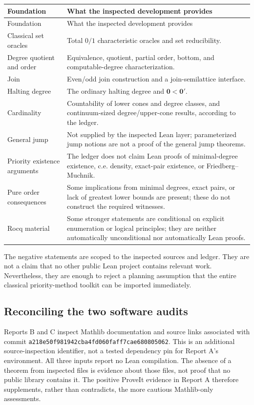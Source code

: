 \documentclass[11pt,a4paper]{article}
\newcommand{\zero}{\mathbf0}
\newcommand{\onejump}{\mathbf0'}
\theoremstyle{definition}\newtheorem{definition}[theorem]{Definition}
\theoremstyle{remark}\newtheorem{remark}[theorem]{Remark}
\begin{document}
\begin{longtable}{@{}p{}p{}@{}}
\toprule
Foundation & What the inspected development provides \\
\midrule
\endfirsthead
\toprule Foundation & What the inspected development provides \\
\midrule
\endhead
\bottomrule
\endfoot
Classical set oracles & Total $0/1$ characteristic oracles and set reducibility. \\
Degree quotient and order & Equivalence, quotient, partial order, bottom, and computable-degree characterization. \\
Join & Even/odd join construction and a join-semilattice interface. \\
Halting degree & The ordinary halting degree and $\zero<\onejump$. \\
Cardinality & Countability of lower cones and degree classes, and continuum-sized degree/upper-cone results, according to the ledger. \\
General jump & Not supplied by the inspected Lean layer; parameterized jump notions are not a proof of the general jump theorems. \\
Priority existence arguments & The ledger does not claim Lean proofs of minimal-degree existence, c.e. density, exact-pair existence, or Friedberg--Muchnik. \\
Pure order consequences & Some implications from minimal degrees, exact pairs, or lack of greatest lower bounds are present; these do not construct the required witnesses. \\
Rocq material & Some stronger statements are conditional on explicit enumeration or logical principles; they are neither automatically unconditional nor automatically Lean proofs. \\
\end{longtable}

The negative statements are scoped to the inspected sources and ledger. They are not a claim that no other public Lean project contains relevant work. Nevertheless, they are enough to reject a planning assumption that the entire classical priority-method toolkit can be imported immediately.\cite{ProveItCoverage}

\subsection{Reconciling the two software audits}
Reports B and C inspect Mathlib documentation and source links associated with commit \texttt{a218e50f981942cba4fd060faff7cae680805062}. This is an additional source-inspection identifier, not a tested dependency pin for Report A's environment. All three inputs report no Lean compilation. The absence of a theorem from inspected files is evidence about those files, not proof that no public library contains it. The positive ProveIt evidence in Report A therefore supplements, rather than contradicts, the more cautious Mathlib-only assessments.\cite{ReportA,ReportB,ReportC,MathlibDoc,RecursiveIn}
\end{document}
